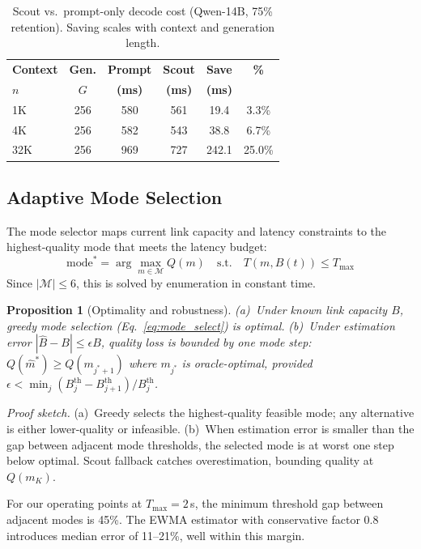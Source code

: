 \documentclass{article}
\begin{document}
\begin{table}[t]
\centering
\caption{Scout vs.\ prompt-only decode cost (Qwen-14B, 75\% retention). Saving scales with context and generation length.}
\label{tab:scout_vs_prompt}
\small
\begin{tabular}{@{}lccccc@{}}
\toprule
\textbf{Context} & \textbf{Gen.} & \textbf{Prompt} & \textbf{Scout} & \textbf{Save} & \textbf{\%} \\
\textbf{$n$} & $G$ & \textbf{(ms)} & \textbf{(ms)} & \textbf{(ms)} & \\
\midrule
1K    & 256  & 580  & 561  &  19.4 & 3.3\% \\
4K    & 256  & 582  & 543  &  38.8 & 6.7\% \\
32K   & 256  & 969  & 727  & 242.1 & 25.0\% \\
\bottomrule
\end{tabular}
\end{table}

\subsection{Adaptive Mode Selection}

The mode selector maps current link capacity and latency constraints to the highest-quality mode that meets the latency budget:
\begin{equation}
    \text{mode}^* = \arg\max_{m \in \mathcal{M}} Q(m) \quad \text{s.t.} \quad T(m, B(t)) \leq T_{\max}
    \label{eq:mode_select}
\end{equation}
Since $|\mathcal{M}| \leq 6$, this is solved by enumeration in constant time.

\textbf{Proposition 1} (Optimality and robustness).
\emph{(a)~Under known link capacity $B$, greedy mode selection (Eq.~\ref{eq:mode_select}) is optimal.}
\emph{(b)~Under estimation error $|\hat{B} - B| \leq \epsilon B$, quality loss is bounded by one mode step: $Q(\hat{m}^*) \geq Q(m_{j^*+1})$ where $m_{j^*}$ is oracle-optimal, provided $\epsilon < \min_j (B_j^{\text{th}} - B_{j+1}^{\text{th}}) / B_j^{\text{th}}$.}

\emph{Proof sketch.}
(a)~Greedy selects the highest-quality feasible mode; any alternative is either lower-quality or infeasible.
(b)~When estimation error is smaller than the gap between adjacent mode thresholds, the selected mode is at worst one step below optimal.
Scout fallback catches overestimation, bounding quality at $Q(m_K)$.

For our operating points at $T_{\max} = 2$\,s, the minimum threshold gap between adjacent modes is 45\%.
The EWMA estimator with conservative factor 0.8 introduces median error of 11--21\%, well within this margin.
\end{document}
